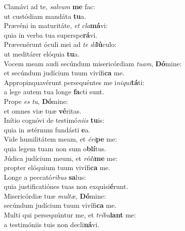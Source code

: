 \evenverse Clamávi ad te, \textit{sal}\textit{vum} \textbf{me} fac:~\*\\
\evenverse ut custódiam mandáta \textbf{tu}a.\\
\oddverse Prævéni in maturitáte, \textit{et} \textit{cla}\textbf{má}vi:~\*\\
\oddverse quia in verba tua superspe\textbf{rá}vi.\\
\evenverse Prævenérunt óculi mei ad \textit{te} \textit{di}\textbf{lú}culo:~\*\\
\evenverse ut meditárer elóquia \textbf{tu}a.\\
\oddverse Vocem meam audi secúndum misericórdiam \textit{tu}\textit{am}, \textbf{Dó}mine:~\*\\
\oddverse et secúndum judícium tuum vivífi\textbf{ca} me.\\
\evenverse Appropinquavérunt persequéntes me i\textit{ni}\textit{qui}\textbf{tá}ti:~\*\\
\evenverse a lege autem tua longe \textbf{fa}cti sunt.\\
\oddverse Prope \textit{es} \textit{tu}, \textbf{Dó}mine:~\*\\
\oddverse et omnes viæ tuæ \textbf{vé}ritas.\\
\evenverse Inítio cognóvi de testimó\textit{ni}\textit{is} \textbf{tu}is:~\*\\
\evenverse quia in ætérnum fundásti \textbf{e}a.\\
\oddverse Vide humilitátem meam, et \textit{é}\textit{ri}\textbf{pe} me:~\*\\
\oddverse quia legem tuam non sum o\textbf{blí}tus.\\
\evenverse Júdica judícium meum, et \textit{ré}\textit{di}\textbf{me} me:~\*\\
\evenverse propter elóquium tuum vivífi\textbf{ca} me.\\
\oddverse Longe a peccató\textit{ri}\textit{bus} \textbf{sa}lus:~\*\\
\oddverse quia justificatiónes tuas non exquisi\textbf{é}runt.\\
\evenverse Misericórdiæ tuæ \textit{mul}\textit{tæ}, \textbf{Dó}mine:~\*\\
\evenverse secúndum judícium tuum vivífi\textbf{ca} me.\\
\oddverse Multi qui persequúntur me, et \textit{trí}\textit{bu}\textbf{lant} me:~\*\\
\oddverse a testimóniis tuis non decli\textbf{ná}vi.\\
